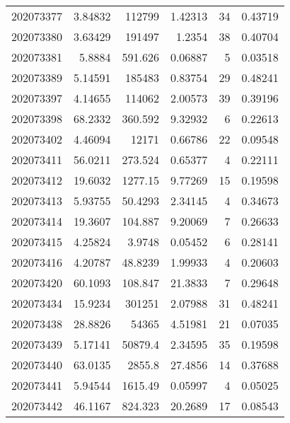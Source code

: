 \begin{tabular}{rrrrrr}
 202073377 &          3.84832 &   112799      &            1.42313 &          34 & 0.43719 \\
 202073380 &          3.63429 &   191497      &            1.2354  &          38 & 0.40704 \\
 202073381 &          5.8884  &      591.626  &            0.06887 &           5 & 0.03518 \\
 202073389 &          5.14591 &   185483      &            0.83754 &          29 & 0.48241 \\
 202073397 &          4.14655 &   114062      &            2.00573 &          39 & 0.39196 \\
 202073398 &         68.2332  &      360.592  &            9.32932 &           6 & 0.22613 \\
 202073402 &          4.46094 &    12171      &            0.66786 &          22 & 0.09548 \\
 202073411 &         56.0211  &      273.524  &            0.65377 &           4 & 0.22111 \\
 202073412 &         19.6032  &     1277.15   &            9.77269 &          15 & 0.19598 \\
 202073413 &          5.93755 &       50.4293 &            2.34145 &           4 & 0.34673 \\
 202073414 &         19.3607  &      104.887  &            9.20069 &           7 & 0.26633 \\
 202073415 &          4.25824 &        3.9748 &            0.05452 &           6 & 0.28141 \\
 202073416 &          4.20787 &       48.8239 &            1.99933 &           4 & 0.20603 \\
 202073420 &         60.1093  &      108.847  &           21.3833  &           7 & 0.29648 \\
 202073434 &         15.9234  &   301251      &            2.07988 &          31 & 0.48241 \\
 202073438 &         28.8826  &    54365      &            4.51981 &          21 & 0.07035 \\
 202073439 &          5.17141 &    50879.4    &            2.34595 &          35 & 0.19598 \\
 202073440 &         63.0135  &     2855.8    &           27.4856  &          14 & 0.37688 \\
 202073441 &          5.94544 &     1615.49   &            0.05997 &           4 & 0.05025 \\
 202073442 &         46.1167  &      824.323  &           20.2689  &          17 & 0.08543 \\

\end{tabular}
